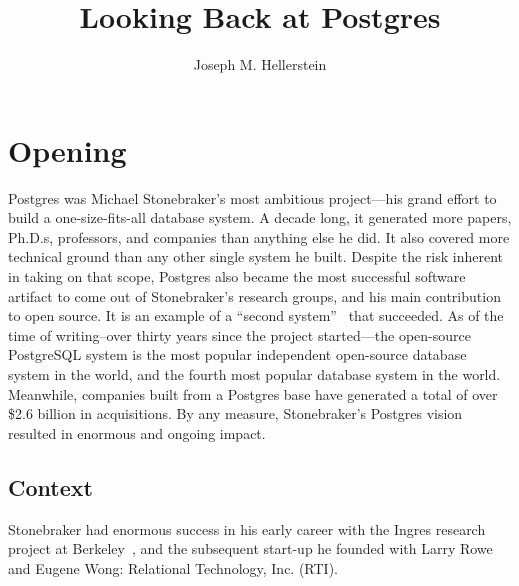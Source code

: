 \documentclass[sigconf,natbib=false]{acmart}
\title{Looking Back at Postgres}
\author{Joseph M. Hellerstein}
\begin{document}
\maketitle



\section{Opening}
Postgres was Michael Stonebraker's most ambitious project---his grand effort to build a one-size-fits-all database system. A decade long, it generated more papers, Ph.D.s, professors, and companies than anything else he did. It also covered more technical ground than any other single system he built. Despite the risk inherent in taking on that scope, Postgres also became the most successful software artifact to come out of Stonebraker's research groups, and his main contribution to open source. It is an example of a ``second system''~\cite{brooks1975mythical} that succeeded. As of the time of writing--over thirty years since the project started---the open-source PostgreSQL system is the most popular independent open-source database system in the world, and the fourth most popular database system in the world. Meanwhile, companies built from a Postgres base have generated a total of over \$2.6 billion in acquisitions. By any measure, Stonebraker's Postgres vision resulted in enormous and ongoing impact.

\subsection{Context}

Stonebraker had enormous success in his early career with the Ingres research project at Berkeley~\cite{stonebraker1976design}, and the subsequent start-up he founded with Larry Rowe and Eugene Wong: Relational Technology, Inc. (RTI).
\end{document}
